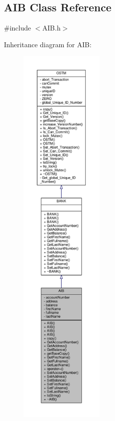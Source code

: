 \hypertarget{class_a_i_b}{}\subsection{A\+IB Class Reference}
\label{class_a_i_b}


{\ttfamily \#include $<$A\+I\+B.\+h$>$}



Inheritance diagram for A\+IB\+:
\nopagebreak
\begin{figure}[H]
\begin{center}
\leavevmode
\includegraphics[height=550pt]{class_a_i_b__inherit__graph}
\end{center}
\end{figure}


